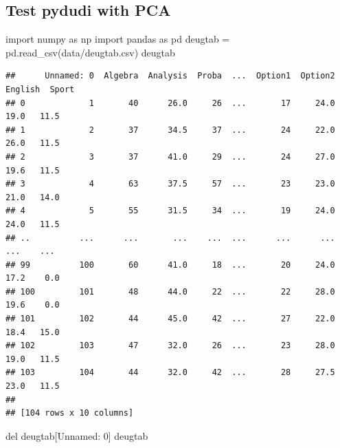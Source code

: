 \documentclass[
  10pt,
]{article}
\newenvironment{Shaded}{\begin{snugshade}}{\end{snugshade}}
\newcommand{\NormalTok}[1]{#1}
\begin{document}
\hypertarget{test-pydudi-with-pca}{%
\subsection{Test pydudi with PCA}\label{test-pydudi-with-pca}}

\begin{Shaded}
\begin{Highlighting}[]
\NormalTok{import numpy as np }
\NormalTok{import pandas as pd}
\NormalTok{deugtab = pd.read\_csv(\textquotesingle{}data/deugtab.csv\textquotesingle{})}
\NormalTok{deugtab}
\end{Highlighting}
\end{Shaded}

\begin{verbatim}
##      Unnamed: 0  Algebra  Analysis  Proba  ...  Option1  Option2  English  Sport
## 0             1       40      26.0     26  ...       17     24.0     19.0   11.5
## 1             2       37      34.5     37  ...       24     22.0     26.0   11.5
## 2             3       37      41.0     29  ...       24     27.0     19.6   11.5
## 3             4       63      37.5     57  ...       23     23.0     21.0   14.0
## 4             5       55      31.5     34  ...       19     24.0     24.0   11.5
## ..          ...      ...       ...    ...  ...      ...      ...      ...    ...
## 99          100       60      41.0     18  ...       20     24.0     17.2    0.0
## 100         101       48      44.0     22  ...       22     28.0     19.6    0.0
## 101         102       44      45.0     42  ...       27     22.0     18.4   15.0
## 102         103       47      32.0     26  ...       23     28.0     19.0   11.5
## 103         104       44      32.0     42  ...       28     27.5     23.0   11.5
## 
## [104 rows x 10 columns]
\end{verbatim}

\begin{Shaded}
\begin{Highlighting}[]
\NormalTok{del deugtab[\textquotesingle{}Unnamed: 0\textquotesingle{}]}
\NormalTok{deugtab}
\end{Highlighting}
\end{Shaded}
\end{document}
